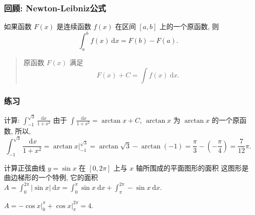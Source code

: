 \documentclass[
10pt,
aspectratio=43,
]{beamer}
\begin{document}
\begin{frame}
	\frametitle{回顾: Newton-Leibniz公式}

	\begin{theorem}
		如果函数 $F(x)$ 是连续函数 $f(x)$ 在区间 $[a, b]$ 上的一个原函数, 则
		$$
			\int_a^b f(x) \mathrm{~d} x=F(b)-F(a) .
		$$
	\end{theorem}
	\vspace{1cm}
	\pause
	\begin{quote}
		原函数 $F(x)$ 满足
		$$
			F (x)+C=\int f(x)\mathrm{~d}x.
		$$
	\end{quote}
\end{frame}

\begin{frame}
	\frametitle{练习}
	\everymath{\displaystyle}
	\begin{block}{计算: $\int_{-1}^{\sqrt{3}} \frac{\mathrm{d} x}{1+x^2}$}
		\pause
		由于 $\int\frac{\mathrm{~d}x}{1+x^2}=\arctan x +C$, $\arctan x$ 为 $\arctan x$ 的一个原函数, 所以,
		\pause
		$$
			\int_{-1}^{\sqrt{3}} \frac{\mathrm{~d} x}{1+x^2}=\left.\arctan x\right|_{-1}^{\sqrt{3}}=\arctan \sqrt{3}-\arctan (-1)=\frac{\pi}{3}-\left(-\frac{\pi}{4}\right)=\frac{7}{12} \pi.
		$$
	\end{block}
	\pause
	\begin{block}{计算正弦曲线 $y=\sin x$ 在 $[0, 2\pi]$ 上与 $x$ 轴所围成的平面图形的面积}
		\pause
		这图形是曲边梯形的一个特例, 它的面积\\\vspace{0.2cm}
		$
			A=\int_0^{2\pi} |\sin x| \mathrm{~d} x=\int_0^{\pi} \sin x \mathrm{~d} x +\int_{\pi}^{2\pi} -\sin x \mathrm{~d} x.
		$
		\pause

		\vspace{0.2cm}
		$
			A= \left.-\cos x\right|_0^\pi+\left.\cos x\right|_\pi^{2\pi}=4.
		$
	\end{block}

\end{frame}
\end{document}
